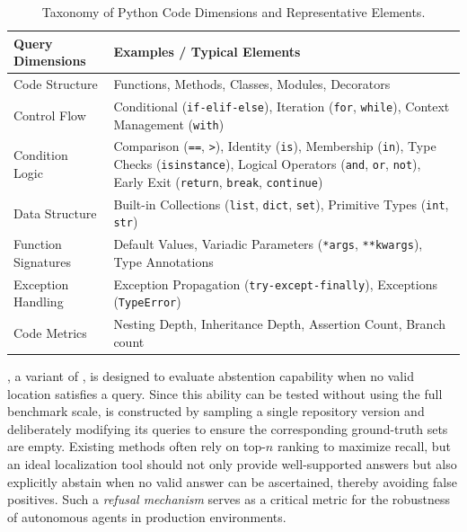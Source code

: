 \begin{table}[htbp]
\centering
\caption{Taxonomy of Python Code Dimensions and Representative Elements.}
\label{tab:code_dimensions-dataloc}
\small
\renewcommand{\arraystretch}{1.2}
\begin{tabularx}{\textwidth}{lX}
\toprule
\textbf{Query Dimensions} & \textbf{Examples / Typical Elements} \\ \midrule
Code Structure & Functions, Methods, Classes, Modules, Decorators \\
Control Flow & Conditional (\texttt{if-elif-else}), Iteration (\texttt{for}, \texttt{while}), Context Management (\texttt{with}) \\
Condition Logic & Comparison (\texttt{==}, \texttt{>}), Identity (\texttt{is}), Membership (\texttt{in}), Type Checks (\texttt{isinstance}), Logical Operators (\texttt{and}, \texttt{or}, \texttt{not}), Early Exit (\texttt{return}, \texttt{break}, \texttt{continue}) \\
Data Structure & Built-in Collections (\texttt{list}, \texttt{dict}, \texttt{set}), Primitive Types (\texttt{int}, \texttt{str}) \\
Function Signatures & Default Values, Variadic Parameters (\texttt{*args}, \texttt{**kwargs}), Type Annotations \\
Exception Handling & Exception Propagation (\texttt{try-except-finally}), Exceptions (\texttt{TypeError}) \\
Code Metrics & Nesting Depth, Inheritance Depth, Assertion Count, Branch count \\ \bottomrule
\end{tabularx}
\end{table}

\textbf{\negset}, a variant of \dataset, is designed to evaluate abstention capability when no valid location satisfies a query. Since this ability can be tested without using the full benchmark scale, \negset is constructed by sampling a single repository version and deliberately modifying its queries to ensure the corresponding ground-truth sets are empty. Existing methods often rely on top-$n$ ranking to maximize recall, but an ideal localization tool should not only provide well-supported answers but also explicitly abstain when no valid answer can be ascertained, thereby avoiding false positives. Such a \textit{refusal mechanism} serves as a critical metric for the robustness of autonomous agents in production environments.

